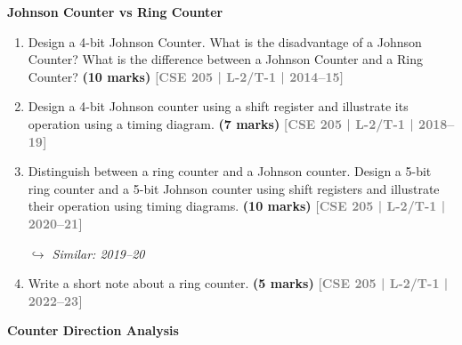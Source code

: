 \documentclass[12pt,a4paper]{article}
\newcommand{\yr}[1]{\hfill\textcolor{gray}{\small\textbf{[#1]}}}
\newcommand{\mk}[1]{\textcolor{orange!70!black}{\small\textbf{(#1 marks)}}}
\newcommand{\variant}[1]{\par\vspace{1pt}\textcolor{blue!50!black}%
  {\footnotesize\textit{$\hookrightarrow$ Similar: #1}}}
\newcommand{\subtopic}[2]{%
  \vspace{10pt}
  \noindent\begin{tcolorbox}[colback=#1!8,colframe=#1,boxrule=0.6pt,arc=4pt,
    left=6pt,right=6pt,top=4pt,bottom=4pt]
    \small\bfseries\textcolor{#1}{#2}
  \end{tcolorbox}
  \vspace{2pt}
}
\begin{document}
\subtopic{cG}{Johnson Counter vs Ring Counter}
\label{sub:s7-johnson}

\begin{enumerate}

\item Design a 4-bit Johnson Counter. What is the disadvantage of a Johnson Counter? What is the difference between a Johnson Counter and a Ring Counter?
\mk{10} \yr{CSE 205 | L-2/T-1 | 2014--15}


\item Design a 4-bit Johnson counter using a shift register and illustrate its operation using a timing diagram.
\mk{7} \yr{CSE 205 | L-2/T-1 | 2018--19}


\item Distinguish between a ring counter and a Johnson counter. Design a 5-bit ring counter and a 5-bit Johnson counter using shift registers and illustrate their operation using timing diagrams.
\mk{10} \yr{CSE 205 | L-2/T-1 | 2020--21}
\variant{2019--20}

\item Write a short note about a ring counter.
\mk{5} \yr{CSE 205 | L-2/T-1 | 2022--23}

\end{enumerate}

\subtopic{cG}{Counter Direction Analysis}
\label{sub:s7-direction}
\end{document}

